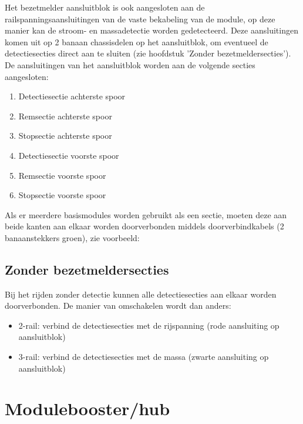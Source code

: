 \documentclass[12pt,a4paper]{report}
\begin{document}
Het bezetmelder aansluitblok is ook aangesloten aan de railspanningsaansluitingen van de vaste bekabeling van de module, op deze manier kan de stroom- en massadetectie worden gedetecteerd. Deze aansluitingen komen uit op 2 banaan chassisdelen op het aansluitblok, om eventueel de detectiesecties direct aan te sluiten (zie hoofdstuk 'Zonder bezetmeldersecties').
De aansluitingen van het aansluitblok worden aan de volgende secties aangesloten:

\begin{enumerate}
\item Detectiesectie achterste spoor
\item Remsectie achterste spoor
\item Stopsectie achterste spoor
\item Detectiesectie voorste spoor
\item Remsectie voorste spoor
\item Stopsectie voorste spoor
\end{enumerate}

Als er meerdere basismodules worden gebruikt als een sectie, moeten deze aan beide kanten aan elkaar worden doorverbonden middels doorverbindkabels (2 banaanstekkers groen), zie voorbeeld:

\subsection{Zonder bezetmeldersecties}
Bij het rijden zonder detectie kunnen alle detectiesecties aan elkaar worden doorverbonden. De manier van omschakelen wordt dan anders:

\begin{itemize}
\item 2-rail: verbind de detectiesecties met de rijspanning (rode aansluiting op aansluitblok)
\item 3-rail: verbind de detectiesecties met de massa (zwarte aansluiting op aansluitblok)
\end{itemize}

\section{Modulebooster/hub}
\end{document}
